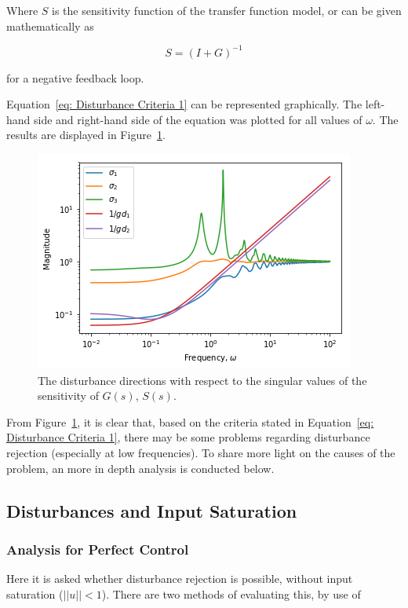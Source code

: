 Where $S$ is the sensitivity function of the transfer function model, or can be given mathematically as 

\begin{equation}
	S = (I + G)^{-1}
\end{equation}

for a negative feedback loop.

Equation~\ref{eq: Disturbance Criteria 1} can be represented graphically. The left-hand side and right-hand side of the equation was plotted for all values of $\omega$. The results are displayed in Figure~\ref{fig:disturbance-analysis-1}.

\begin{figure}[H]
	\centering
	\includegraphics[width=0.7\linewidth]{"Figures/Disturbance Analysis 1"}
	\caption{The disturbance directions with respect to the singular values of the sensitivity of $G(s)$, $S(s)$.}
	\label{fig:disturbance-analysis-1}
\end{figure}

From Figure~\ref{fig:disturbance-analysis-1}, it is clear that, based on the criteria stated in Equation~\ref{eq: Disturbance Criteria 1}, there may be some problems regarding disturbance rejection (especially at low frequencies). To share more light on the causes of the problem, an more in depth analysis is conducted below.

\subsection{Disturbances and Input Saturation}

\subsubsection{Analysis for Perfect Control}
Here it is asked whether disturbance rejection is possible, without input saturation \newline($||u||<1$). There are two methods of evaluating this, by use of


